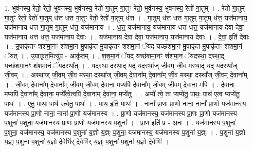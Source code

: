 \documentclass[17pt]{extarticle}
\begin{document}
1. भुव॑नस्य॒ रेतो॒ रेतो॒ भुव॑नस्य॒ भुव॑नस्य॒ रेतो॑ गा॒तुम् गा॒तुꣳ रेतो॒ भुव॑नस्य॒ भुव॑नस्य॒ रेतो॑ गा॒तुम् । . रेतो॑ गा॒तुम् गा॒तुꣳ रेतो॒ रेतो॑ गा॒तुम् ध॑त्त धत्त गा॒तुꣳ रेतो॒ रेतो॑ गा॒तुम् ध॑त्त । . गा॒तुम् ध॑त्त धत्त गा॒तुम् गा॒तुम् ध॑त्त॒ यज॑मानाय॒ यज॑मानाय धत्त गा॒तुम् गा॒तुम् ध॑त्त॒ यज॑मानाय । . ध॒त्त॒ यज॑मानाय॒ यज॑मानाय धत्त धत्त॒ यज॑मानाय देवा देवा॒ यज॑मानाय धत्त धत्त॒ यज॑मानाय देवाः । . यज॑मानाय देवा देवा॒ यज॑मानाय॒ यज॑मानाय देवाः । . दे॒वा॒ इति॑ देवाः । . उ॒पाकृ॑तꣳ शशमा॒नꣳ श॑शमा॒न मु॒पाकृ॑त मु॒पाकृ॑तꣳ शशमा॒नं ॅयद् यच्छ॑शमा॒न मु॒पाकृ॑त मु॒पाकृ॑तꣳ शशमा॒नं ॅयत् । . उ॒पाकृ॑त॒मित्यु॑प - आकृ॑तम् । . श॒श॒मा॒नं ॅयद् यच्छ॑शमा॒नꣳ श॑शमा॒नं ॅयदस्था॒ दस्था॒द् यच्छ॑शमा॒नꣳ श॑शमा॒नं ॅयदस्था᳚त् । . यदस्था॒ दस्था॒द् यद् यदस्था᳚ज् जी॒वम् जी॒व मस्था॒द् यद् यदस्था᳚ज् जी॒वम् । . अस्था᳚ज् जी॒वम् जी॒व मस्था॒ दस्था᳚ज् जी॒वम् दे॒वाना᳚म् दे॒वाना᳚म् जी॒व मस्था॒ दस्था᳚ज् जी॒वम् दे॒वाना᳚म् । . जी॒वम् दे॒वाना᳚म् दे॒वाना᳚म् जी॒वम् जी॒वम् दे॒वाना॒ मप्यपि॑ दे॒वाना᳚म् जी॒वम् जी॒वम् दे॒वाना॒ मपि॑ । . दे॒वाना॒ मप्यपि॑ दे॒वाना᳚म् दे॒वाना॒ मप्ये᳚त्वे॒त्वपि॑ दे॒वाना᳚म् दे॒वाना॒ मप्ये॑तु । . अप्ये᳚ त्वे॒ त्व प्यप्ये॑तु॒ पाथः॒ पाथ॑ ए॒त्व प्यप्ये॑तु॒ पाथः॑ । . ए॒तु॒ पाथः॒ पाथ॑ एत्वेतु॒ पाथः॑ । . पाथ॒ इति॒ पाथः॑ । . नाना᳚ प्रा॒णः प्रा॒णो नाना॒ नाना᳚ प्रा॒णो यज॑मानस्य॒ यज॑मानस्य प्रा॒णो नाना॒ नाना᳚ प्रा॒णो यज॑मानस्य । . प्रा॒णो यज॑मानस्य॒ यज॑मानस्य प्रा॒णः प्रा॒णो यज॑मानस्य प॒शुना॑ प॒शुना॒ यज॑मानस्य प्रा॒णः प्रा॒णो यज॑मानस्य प॒शुना᳚ । . प्रा॒ण इति॑ प्र - अ॒नः । . यज॑मानस्य प॒शुना॑ प॒शुना॒ यज॑मानस्य॒ यज॑मानस्य प॒शुना॑ य॒ज्ञो य॒ज्ञ्ः प॒शुना॒ यज॑मानस्य॒ यज॑मानस्य प॒शुना॑ य॒ज्ञ्ः । . प॒शुना॑ य॒ज्ञो य॒ज्ञ्ः प॒शुना॑ प॒शुना॑ य॒ज्ञो दे॒वेभि॑र् दे॒वेभि॑र् य॒ज्ञ्ः प॒शुना॑ प॒शुना॑ य॒ज्ञो दे॒वेभिः॑ । \newline
\end{document}
